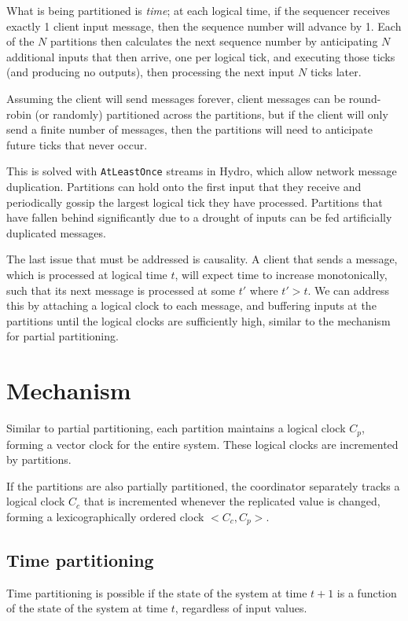 \documentclass{article}
\begin{document}
What is being partitioned is \emph{time}; at each logical time, if the sequencer receives exactly 1 client input message, then the sequence number will advance by 1.
Each of the $N$ partitions then calculates the next sequence number by anticipating $N$ additional inputs that then arrive, one per logical tick, and executing those ticks (and producing no outputs), then processing the next input $N$ ticks later.

Assuming the client will send messages forever, client messages can be round-robin (or randomly) partitioned across the partitions, but if the client will only send a finite number of messages, then the partitions will need to anticipate future ticks that never occur.

This is solved with \texttt{AtLeastOnce} streams in Hydro, which allow network message duplication.
Partitions can hold onto the first input that they receive and periodically gossip the largest logical tick they have processed.
Partitions that have fallen behind significantly due to a drought of inputs can be fed artificially duplicated messages.

The last issue that must be addressed is causality.
A client that sends a message, which is processed at logical time $t$, will expect time to increase monotonically, such that its next message is processed at some $t'$ where $t' > t$.
We can address this by attaching a logical clock to each message, and buffering inputs at the partitions until the logical clocks are sufficiently high, similar to the mechanism for partial partitioning.


\section{Mechanism}
Similar to partial partitioning, each partition maintains a logical clock $C_p$, forming a vector clock for the entire system.
These logical clocks are incremented by partitions.

If the partitions are also partially partitioned, the coordinator separately tracks a logical clock $C_c$ that is incremented whenever the replicated value is changed, forming a lexicographically ordered clock $<C_c, C_p>$.

\subsection{Time partitioning}
Time partitioning is possible if the state of the system at time $t+1$ is a function of the state of the system at time $t$, regardless of input values.
\end{document}
